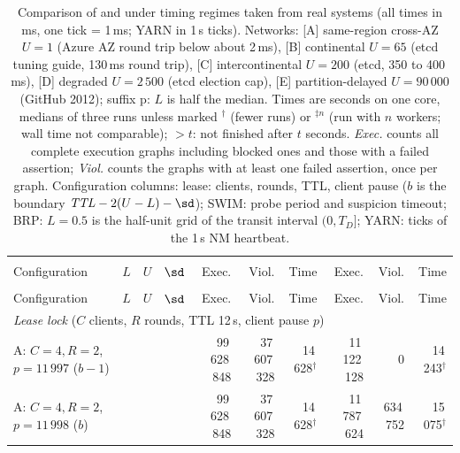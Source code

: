 \begingroup\footnotesize\setlength{\tabcolsep}{2pt}
\begin{longtable}{@{}l*{3}{>{\centering\arraybackslash}p{3.2em}}rrrrrr@{}}
\caption{Comparison of \must{} and \tool{} under timing regimes taken from real systems (all times in ms, one tick = 1\,ms; YARN in 1\,s ticks). Networks: [A] same-region cross-AZ $U{=}1$ (Azure AZ round trip below about 2\,ms), [B] continental $U{=}65$ (etcd tuning guide, 130\,ms round trip), [C] intercontinental $U{=}200$ (etcd, 350 to 400\,ms), [D] degraded $U{=}2\,500$ (etcd election cap), [E] partition-delayed $U{=}90\,000$ (GitHub 2012); suffix p: $L$ is half the median. Times are seconds on one core, medians of three runs unless marked $^\dagger$ (fewer runs) or $^{\ddagger n}$ (run with $n$ workers; wall time not comparable); $>t$: not finished after $t$ seconds. \emph{Exec.} counts all complete execution graphs including blocked ones and those with a failed assertion; \emph{Viol.} counts the graphs with at least one failed assertion, once per graph. Configuration columns: lease: clients, rounds, TTL, client pause ($b$ is the boundary $\mathit{TTL}-2(U-L)-\sd$); SWIM: probe period and suspicion timeout; BRP: $L{=}0.5$ is the half-unit grid of the transit interval $(0,T_D]$; YARN: ticks of the 1\,s NM heartbeat.}\label{tab:evaluation-full}\\
    \toprule
    & \multicolumn{3}{c}{Timing} & \multicolumn{3}{c}{\must{}} & \multicolumn{3}{c}{\tool{}} \\
    \cmidrule(lr){2-4}\cmidrule(lr){5-7}\cmidrule(l){8-10}
    Configuration & $L$ & $U$ & $\sd$ & Exec. & Viol. & Time & Exec. & Viol. & Time \\
    \midrule
\endfirsthead
    \toprule
    & \multicolumn{3}{c}{Timing} & \multicolumn{3}{c}{\must{}} & \multicolumn{3}{c}{\tool{}} \\
    \cmidrule(lr){2-4}\cmidrule(lr){5-7}\cmidrule(l){8-10}
    Configuration & $L$ & $U$ & $\sd$ & Exec. & Viol. & Time & Exec. & Viol. & Time \\
    \midrule
\endhead
    \multicolumn{10}{l}{\emph{Lease lock} ($C$ clients, $R$ rounds, TTL 12\,s, client pause $p$)} \\
    \quad A: $C{=}4,R{=}2$, $p{=}11\,997$ ($b{-}1$) & 0 & 1 & 0 & 99\,628\,848 & 37\,607\,328 & 14\,628$^\dagger$ & 11\,122\,128 & 0 & 14\,243$^\dagger$ \\
    \quad A: $C{=}4,R{=}2$, $p{=}11\,998$ ($b$) & 0 & 1 & 0 & 99\,628\,848 & 37\,607\,328 & 14\,628$^\dagger$ & 11\,787\,624 & 634\,752 & 15\,075$^\dagger$ \\

\end{longtable}
